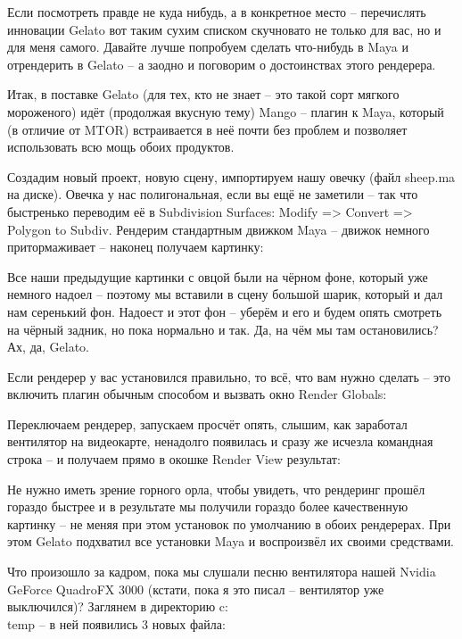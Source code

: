  

 Если посмотреть правде не куда нибудь, а в
    конкретное место – перечислять инновации Gelato вот таким сухим
    списком скучновато не только для вас, но и для меня самого. Давайте
    лучше попробуем сделать что-нибудь в Maya и отрендерить в Gelato –
    а заодно и поговорим о достоинствах этого рендерера.
  

 Итак, в поставке Gelato (для тех, кто не знает –
    это такой сорт мягкого мороженого) идёт (продолжая вкусную тему)
    Mango  – плагин к Maya,
    который (в отличие от MTOR) встраивается в неё почти без проблем и
    позволяет использовать всю мощь обоих продуктов.
  

 Создадим новый проект, новую сцену, импортируем
    нашу овечку (файл sheep.ma на диске). Овечка у нас полигональная,
    если вы ещё не заметили – так что быстренько переводим её в
    Subdivision Surfaces: Modify => Convert => Polygon to Subdiv.
    Рендерим стандартным движком Maya – движок немного притормаживает –
    наконец получаем картинку:
  

  

 Все наши предыдущие картинки с овцой были на чёрном
    фоне, который уже немного надоел – поэтому мы вставили в сцену
    большой шарик, который и дал нам серенький фон. Надоест и этот фон
    – уберём и его и будем опять смотреть на чёрный задник, но пока
    нормально и так. Да, на чём мы там остановились? Ах, да,
    Gelato.
  

 Если рендерер у вас установился правильно, то всё,
    что вам нужно сделать – это включить плагин обычным способом и
    вызвать окно Render Globals:
  

  

 Переключаем рендерер, запускаем просчёт опять,
    слышим, как заработал вентилятор на видеокарте, ненадолго появилась
    и сразу же исчезла командная строка – и получаем прямо в окошке
    Render View результат:
  

  

 Не нужно иметь зрение горного орла, чтобы увидеть,
    что рендеринг прошёл гораздо быстрее и в результате мы получили
    гораздо более качественную картинку – не меняя при этом установок
    по умолчанию в обоих рендерерах. При этом Gelato подхватил все
    установки Maya и воспроизвёл их своими средствами.
  

 Что произошло за кадром, пока мы слушали песню
    вентилятора нашей Nvidia GeForce QuadroFX 3000 (кстати, пока я это
    писал – вентилятор уже выключился)? Заглянем в директорию c:\\temp –
    в ней появились 3 новых файла:
  
